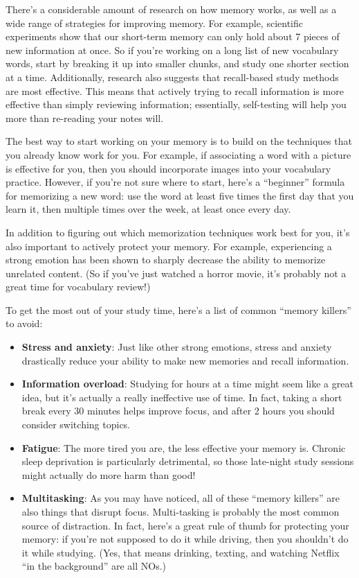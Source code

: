 \documentclass[../main.tex]{subfiles}
\begin{document}
There's a considerable amount of research on how memory works, as well as a wide
range of strategies for improving memory. For example, scientific experiments
show that our short-term memory can only hold about 7 pieces of new information
at once. So if you're working on a long list of new vocabulary words, start by
breaking it up into smaller chunks, and study one shorter section at a time.
Additionally, research also suggests that recall-based study methods are most
effective. This means that actively trying to recall information is more
effective than simply reviewing information; essentially, self-testing will help
you more than re-reading your notes will.

The best way to start working on your memory is to build on the techniques that
you already know work for you. For example, if associating a word with a picture
is effective for you, then you should incorporate images into your vocabulary
practice. However, if you're not sure where to start, here's a ``beginner''
formula for memorizing a new word: use the word at least five times the first
day that you learn it, then multiple times over the week, at least once every
day.

In addition to figuring out which memorization techniques work best for you,
it's also important to actively protect your memory. For example, experiencing a
strong emotion has been shown to sharply decrease the ability to memorize
unrelated content. (So if you've just watched a horror movie, it's probably not
a great time for vocabulary review!)

To get the most out of your study time, here's a list of common ``memory killers''
to avoid:
\begin{itemize}
  \item \textbf{Stress and anxiety}: Just like other strong emotions, stress and
    anxiety drastically reduce your ability to make new memories and recall
    information.
  \item \textbf{Information overload}: Studying for hours at a time might seem
    like a great idea, but it's actually a really ineffective use of time. In
    fact, taking a short break every 30 minutes helps improve focus, and after 2
    hours you should consider switching topics.
  \item \textbf{Fatigue}: The more tired you are, the less effective your memory
    is. Chronic sleep deprivation is particularly detrimental, so those
    late-night study sessions might actually do more harm than good!
  \item \textbf{Multitasking}: As you may have noticed, all of these ``memory
    killers'' are also things that disrupt focus. Multi-tasking is probably the
    most common source of distraction. In fact, here's a great rule of thumb for
    protecting your memory: if you're not supposed to do it while driving, then
    you shouldn't do it while studying. (Yes, that means drinking, texting, and
    watching Netflix ``in the background'' are all NOs.)
\end{itemize}
\end{document}
